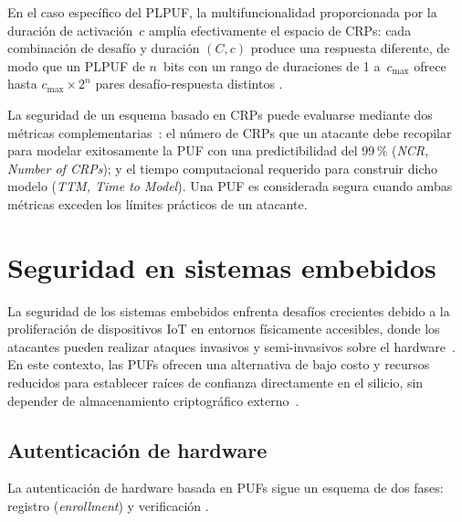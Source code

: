 En el caso específico del PLPUF, la multifuncionalidad proporcionada por la
duración de activación~$c$ amplía efectivamente el espacio de CRPs: cada
combinación de desafío y duración $(C, c)$ produce una respuesta diferente,
de modo que un PLPUF de $n$~bits con un rango de duraciones de 1 a~$c_{\max}$
ofrece hasta $c_{\max} \times 2^n$ pares desafío-respuesta distintos
\cite{hori_2011_pseudolfsr}.

La seguridad de un esquema basado en CRPs puede evaluarse mediante dos
métricas complementarias~\cite{idriss_2016_puf}: el número de CRPs que un
atacante debe recopilar para modelar exitosamente la PUF con una
predictibilidad del 99\,\% (\textit{NCR, Number of CRPs}); y el tiempo
computacional requerido para construir dicho modelo (\textit{TTM, Time to
Model}). Una PUF es considerada segura cuando ambas métricas exceden los
límites prácticos de un atacante.


\section{Seguridad en sistemas embebidos}
\label{sec:seguridad}

La seguridad de los sistemas embebidos enfrenta desafíos crecientes debido a
la proliferación de dispositivos IoT en entornos físicamente accesibles, donde
los atacantes pueden realizar ataques invasivos y semi-invasivos sobre el
hardware~\cite{shamsoshoara_2020_puf, parikh_2025_survey}. En este contexto,
las PUFs ofrecen una alternativa de bajo costo y recursos reducidos para
establecer raíces de confianza directamente en el silicio, sin depender de
almacenamiento criptográfico externo~\cite{handschuh_2011_hardware}.

\subsection{Autenticación de hardware}
\label{sec:autenticacion}

La autenticación de hardware basada en PUFs sigue un esquema de dos fases:
registro (\textit{enrollment}) y verificación
\cite{shamsoshoara_2020_puf, almeer_2023_puf}.

